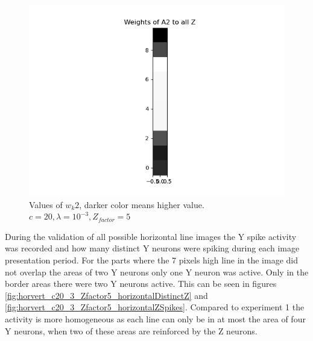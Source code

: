 \begin{figure}
  \includegraphics[width=\linewidth]{figures/horvert/horvert_c20_3_Zfactor5_priorWeight2.png}
  \caption{Values of $w_k2$, darker color means higher value. $c = 20, \lambda = 10^{-3}, Z_{factor} = 5$}
  \label{fig:wkl2}
\end{figure}

During the validation of all possible horizontal line images the Y spike activity was recorded and how many distinct Y neurons were spiking during each image presentation period. For the parts where the 7 pixels high line in the image did not overlap the areas of two Y neurons only one Y neuron was active. Only in the border areas there were two Y neurons active. This can be seen in figures \ref{fig:horvert_c20_3_Zfactor5_horizontalDistinctZ} and \ref{fig:horvert_c20_3_Zfactor5_horizontalZSpikes}. Compared to experiment 1 the activity is more homogeneous as each line can only be in at most the area of four Y neurons, when two of these areas are reinforced by the Z neurons.

